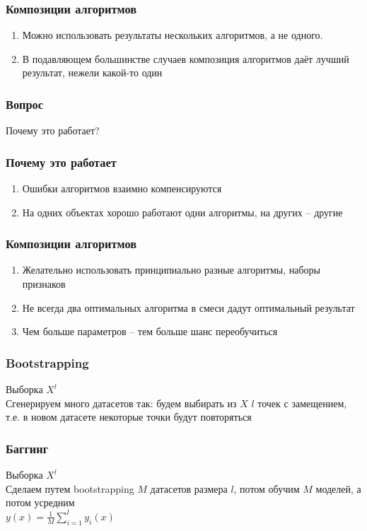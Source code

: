 \documentclass[12pt]{beamer}
\begin{document}
\begin{frame}\frametitle{Композиции алгоритмов}
\begin{enumerate} [--]
\item Можно использовать результаты нескольких	алгоритмов, а не одного.
\item В подавляющем большинстве случаев композиция алгоритмов даёт лучший результат, нежели какой-то один
\end{enumerate}
\end{frame}


\begin{frame}\frametitle{Вопрос}
Почему это работает?
\end{frame}

\begin{frame}\frametitle{Почему это работает}
\begin{enumerate} [--]
\item Ошибки	 алгоритмов взаимно компенсируются	
\item На одних объектах хорошо работают одни алгоритмы, на других -- другие	
\end{enumerate}
\end{frame}

\begin{frame}\frametitle{Композиции алгоритмов}
\begin{enumerate} [--]
\item Желательно	 использовать принципиально разные алгоритмы, наборы признаков	
\item Не	 всегда два оптимальных алгоритма в смеси дадут оптимальный результат
\item Чем больше параметров -- тем больше шанс	 переобучиться	
\end{enumerate}
\end{frame}


\begin{frame}\frametitle{Bootstrapping}
Выборка $X^l$\\
\vspace{5mm}
Сгенерируем много датасетов так: будем выбирать из $X$ $l$ точек с замещением, т.е. в новом датасете
некоторые точки будут повторяться
\end{frame}

\begin{frame}\frametitle{Баггинг}
Выборка $X^l$\\
\vspace{5mm}
Сделаем путем bootstrapping $M$ датасетов размера $l$, потом обучим $M$ моделей, а потом усредним\\
$y(x) = \frac{1}{M} \sum\limits_{i=1}^l y_i(x)$

\end{frame}
\end{document}
